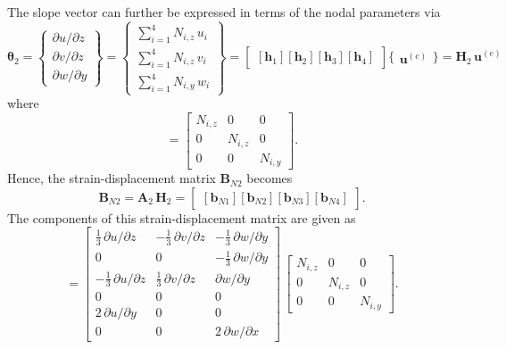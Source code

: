 The slope vector can further be expressed in terms of the nodal parameters via
\begin{equation}
\boldsymbol{\theta}_2 =  \begin{Bmatrix}
\partial u / \partial z\\
\partial v / \partial z \\
\partial w / \partial y
\end{Bmatrix}
= \begin{Bmatrix}
\sum\nolimits_{i=1}^4 N_{i,z} \, u_i\\
\sum\nolimits_{i=1}^4 N_{i,z} \, v_i \\
\sum\nolimits_{i=1}^4 N_{i,y} \, w_i
\end{Bmatrix} 
= \begin{bmatrix}
[\mathbf{h}_1] [\mathbf{h}_2] [\mathbf{h}_3] [\mathbf{h}_4] 
\end{bmatrix} \bigl\{ \begin{matrix} \mathbf{u}^{(e)} \end{matrix} \bigr\}
= \mathbf{H}_2 \, \mathbf{u}^{(e)} 
\end{equation}
where 
\begin{equation}
[\mathbf{h}_i] = \begin{bmatrix}
N_{i,z} &  0 & 0  \\
0 & N_{i,z} & 0  \\
0 & 0 & N_{i,y} \end{bmatrix} .
\end{equation}
Hence, the strain-displacement matrix $\mathbf{B}_{N2}$ becomes
\begin{equation}
\mathbf{B}_{N2} = \mathbf{A}_2 \, \mathbf{H}_2 = \begin{bmatrix}
[\mathbf{b}_{N1}] [\mathbf{b}_{N2}] [\mathbf{b}_{N3}] [\mathbf{b}_{N4}]
\end{bmatrix}. 
\end{equation}
The components of this strain-displacement matrix are given as
\begin{equation}
[\mathbf{b}_{Ni}] =  \begin{bmatrix}
	\tfrac{1}{3} \, \partial u / \partial z &  - \tfrac{1}{3} \, \partial v / \partial z & - \tfrac{1}{3} \, \partial w / \partial y  \\
	0 & 0 & - \tfrac{1}{3} \, \partial w / \partial y  \\
	-\tfrac{1}{3} \, \partial u / \partial z  & \tfrac{1}{3} \, \partial v / \partial z & \partial w / \partial y \\
	0 & 0 & 0  \\
	2 \, \partial u / \partial y &  0 & 0 \\
	0 &  0 &  2 \, \partial w / \partial x  \end{bmatrix} \, \begin{bmatrix}
N_{i,z} &  0 & 0  \\
0 & N_{i,z} & 0  \\
0 & 0 & N_{i,y}  \end{bmatrix}. 
\end{equation}

